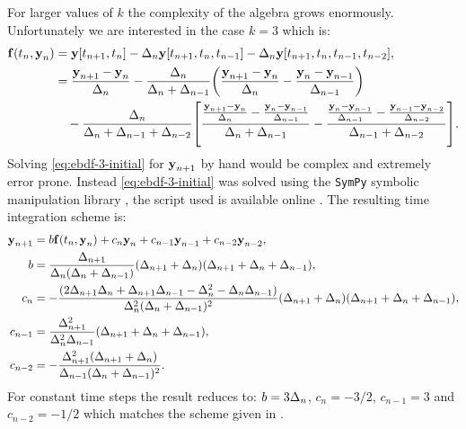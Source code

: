For larger values of $k$ the complexity of the algebra grows enormously.
Unfortunately we are interested in the case $k=3$ which is:
\begin{equation}
  \begin{aligned}
    {\boldsymbol{\mathrm{f}}}(t_n, \boldsymbol{\mathrm{y}}_n) &= \boldsymbol{\mathrm{y}}[t_{n+1}, t_n] - \Delta_{n} \boldsymbol{\mathrm{y}}[t_{n+1}, t_n, t_{n-1}] -\Delta_{n} \boldsymbol{\mathrm{y}}[t_{n+1}, t_n, t_{n-1}, t_{n-2}], \\
    &=  \frac{\boldsymbol{\mathrm{y}}_{n+1} - \boldsymbol{\mathrm{y}}_n}{\Delta_{n}}
    - \frac{\Delta_{n}}{\Delta_{n} + \Delta_{n-1}} {\left(  \frac{\boldsymbol{\mathrm{y}}_{n+1} - \boldsymbol{\mathrm{y}}_n}{\Delta_{n}} - \frac{\boldsymbol{\mathrm{y}}_n - \boldsymbol{\mathrm{y}}_{n-1}}{\Delta_{n-1}} \right)} \\
    &\quad - \frac{\Delta_{n}}{\Delta_{n} + \Delta_{n-1} + \Delta_{n-2}}
         {\left[ 
           \frac{\frac{\boldsymbol{\mathrm{y}}_{n+1} - \boldsymbol{\mathrm{y}}_n}{\Delta_{n}} - \frac{\boldsymbol{\mathrm{y}}_n - \boldsymbol{\mathrm{y}}_{n-1}}{\Delta_{n-1}}}
                {\Delta_{n} +\Delta_{n-1}}
           -
           \frac{\frac{\boldsymbol{\mathrm{y}}_{n} - \boldsymbol{\mathrm{y}}_{n-1}}{\Delta_{n-1}} - \frac{\boldsymbol{\mathrm{y}}_{n-1} - \boldsymbol{\mathrm{y}}_{n-2}}{\Delta_{n-2}}}
                {\Delta_{n-1} +\Delta_{n-2}}
          \right]}.
  \end{aligned}
  \label{eq:ebdf-3-initial}
\end{equation}
Solving \cref{eq:ebdf-3-initial} for $\boldsymbol{\mathrm{y}}_{n+1}$ by hand would be complex and extremely error prone.
Instead \cref{eq:ebdf-3-initial} was solved using the \texttt{SymPy} symbolic manipulation library \cite{sympy}, the script used is available online \cite{sympy-ebdf3-script}.
The resulting time integration scheme is:
\begin{equation}
  \label{eqn:ebdf-coeffs}
  \begin{aligned}
    \boldsymbol{\mathrm{y}}_{n+1} &= b {\boldsymbol{\mathrm{f}}}(t_n, \boldsymbol{\mathrm{y}}_n) + c_n \boldsymbol{\mathrm{y}}_n + c_{n-1} \boldsymbol{\mathrm{y}}_{n-1} + c_{n-2} \boldsymbol{\mathrm{y}}_{n-2}, \\
    b &= \frac{\Delta_{n+1}}{\Delta_{n} (\Delta_{n} + \Delta_{n-1})} (\Delta_{n+1} + \Delta_{n}) (\Delta_{n+1} + \Delta_{n} + \Delta_{n-1}) ,\\
    c_n &= - \frac{ (2 \Delta_{n+1} \Delta_{n} + \Delta_{n+1} \Delta_{n-1} - \Delta_{n}^{2} - \Delta_{n} \Delta_{n-1}) }{\Delta_{n}^{2} (\Delta_{n} + \Delta_{n-1})^{2}} (\Delta_{n+1} + \Delta_{n}) (\Delta_{n+1} + \Delta_{n} + \Delta_{n-1}),\\
    c_{n-1} &= \frac{\Delta_{n+1}^{2}}{\Delta_{n}^{2} \Delta_{n-1}} (\Delta_{n+1} + \Delta_{n} + \Delta_{n-1}) ,\\
    c_{n-2} &= - \frac{\Delta_{n+1}^{2} (\Delta_{n+1} + \Delta_{n})}{\Delta_{n-1} (\Delta_{n} + \Delta_{n-1})^{2}}.
  \end{aligned}
\end{equation}
For constant time steps the result reduces to: $ b = 3\Delta_{n}$, $c_n = -3/2$, $c_{n-1} = 3$ and  $c_{n-2} = -1/2$ which matches the scheme given in \cite[364]{HairerNorsettWanner}.

